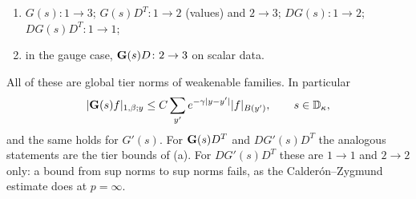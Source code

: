 \begin{theorem}
\begin{enumerate}[label=(\alph*)]
\item $G(s)\colon1\to3$; $G(s)D^T\colon1\to2$ (values) and $2\to3$; $DG(s)\colon1\to2$; $DG(s)D^T\colon1\to1$;
\item in the gauge case, $\mathbf G(s)D\colon2\to3$ on scalar data.
\end{enumerate}
All of these are global tier norms of weakenable families. In particular
\[
|\mathbf G(s)f|_{1,\beta;y}\le C\sum_{y'}e^{-\gamma|y-y'|}|f|_{B(y')},\qquad s\in\mathbb D_\kappa ,
\]
and the same holds for $G'(s)$. For $\mathbf G(s)D^T$ and $DG'(s)D^T$ the analogous statements are the tier bounds of (a). For $DG'(s)D^T$ these are $1\to1$ and $2\to2$ only: a bound from sup norms to sup norms fails, as the Calder\'on--Zygmund estimate does at $p=\infty$.
\end{theorem}

